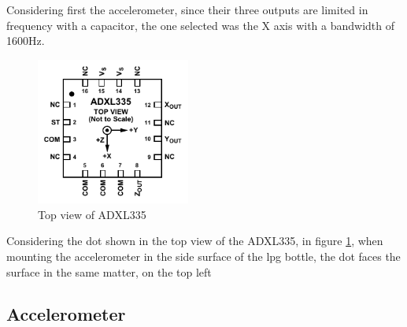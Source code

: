 Considering first the accelerometer, since their three outputs are limited in frequency with a capacitor, the one selected was the X axis with a bandwidth of 1600Hz.
\begin{figure}[]
    \centering
    \includegraphics[width=0.45\textwidth]{Chapters/4CHP/Figures/accTopView.pdf}
    \caption{Top view of ADXL335}
    \label{fig:topViewADXL}
\end{figure}
Considering the dot shown in the top view of the ADXL335, in figure \ref{fig:topViewADXL}, when mounting the accelerometer in the side surface of the \acrshort{lpg} bottle, the dot faces the surface in the same matter, on the top left

\subsection{Accelerometer}

